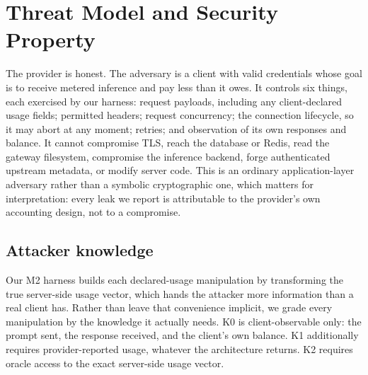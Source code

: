 \documentclass[preprint,3p,authoryear,12pt]{elsarticle}
\begin{document}
\begin{table}[t]
\caption{Adversary directions in LLM inference accounting. Prior work covers the first
three rows; this paper studies the fourth.}
\label{tab:quadrant}
\centering
{}
\end{table}

\section{Threat Model and Security Property}
\label{sec:threat}
The provider is honest. The adversary is a client with valid credentials whose goal is to
receive metered inference and pay less than it owes. It controls six things, each
exercised by our harness: request payloads, including any client-declared usage fields;
permitted headers; request concurrency; the connection lifecycle, so it may abort at any
moment; retries; and observation of its own responses and balance. It cannot compromise
TLS, reach the database or Redis, read the gateway filesystem, compromise the inference
backend, forge authenticated upstream metadata, or modify server code. This is an
ordinary application-layer adversary rather than a symbolic cryptographic one, which
matters for interpretation: every leak we report is attributable to the provider's own
accounting design, not to a compromise.

\subsection{Attacker knowledge}
Our M2 harness builds each declared-usage manipulation by transforming the true
server-side usage vector, which hands the attacker more information than a real client
has. Rather than leave that convenience implicit, we grade every manipulation by the
knowledge it actually needs. K0 is client-observable only: the prompt sent, the response
received, and the client's own balance. K1 additionally requires provider-reported usage,
whatever the architecture returns. K2 requires oracle access to the exact server-side
usage vector.
\end{document}
